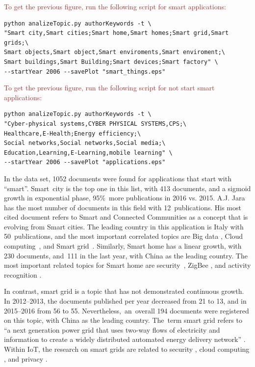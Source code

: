 \documentclass[symmetry,article,accept,moreauthors,pdftex10pt,a4paper]{mdpi}
\begin{document}
\noindent
\textcolor{brown}{To get the previous figure, run the following script for smart applications:}\\
\begin{verbatim}
python analizeTopic.py authorKeywords -t \
"Smart city,Smart cities;Smart home,Smart homes;Smart grid,Smart grids;\
Smart objects,Smart object,Smart enviroments,Smart enviroment;\
Smart buildings,Smart Building;Smart devices;Smart factory" \
--startYear 2006 --savePlot "smart_things.eps"
\end{verbatim}

\noindent
\textcolor{brown}{To get the previous figure, run the following script for not start smart applications:}\\
\begin{verbatim}
python analizeTopic.py authorKeywords -t \
"Cyber-physical systems,CYBER PHYSICAL SYSTEMS,CPS;\
Healthcare,E-Health;Energy efficiency;\
Social networks,Social networks,Social media;\
Education,Learning,E-Learning,mobile learning" \
--startYear 2006 --savePlot "applications.eps"
\end{verbatim}

In the data set, 1052 documents were found for applications that start with ``smart''. Smart~city is the top one in this list, with 413 documents, and a sigmoid growth in exponential phase, 95\%~more publications in 2016 vs. 2015. A.J. Jara has the most number of documents in this field with 12~publications. His most cited document \cite{7406686} refers to Smart and Connected Communities as a concept that is evolving from Smart cities. The leading country in this application is Italy with 50~publications, and the most important correlated topics are Big data \cite{Li2014631,Moreno-Cano2015418,GomezRomero2016}, Cloud computing~\cite{Kaur2016,Chang201642}, and Smart grid~\cite{Longo2014458,Longo2015281}. Similarly, Smart home has a linear growth, with 230 documents, and~111 in the last year, with China as the leading country. The most important related topics for Smart home are security~\cite{UlRehman2016,Alohali2014115,Peter2017}, ZigBee \cite{Peng2016335,Yiqi2014114,Gong201689}, and activity recognition \cite{Cicirelli2016,Bourobou201511953,Fortino2015}.

In contrast, smart grid is a topic that has not demonstrated continuous growth. In 2012--2013, the documents published per year decreased from 21 to 13, and in 2015--2016 from 56 to 55. Nevertheless,~an~overall 194 documents were registered on this topic, with China as the leading country. The~term smart grid refers to ``a next generation power grid that uses two-way flows of electricity and information to create a widely distributed automated energy delivery network'' \cite{Fang2012944}. Within IoT, the research on smart grids are related to  security \cite{Noll2014371,Pitas2014231,Dalipi201663}, cloud computing \cite{Meloni2016387,Wang20111}, and privacy \cite{Beligianni2016,Winter201545,Dalipi201663}.
\end{document}
